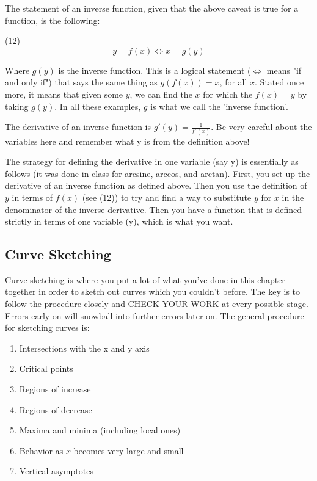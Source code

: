 \documentclass[12pt]{amsart}
\begin{document}
The statement of an inverse function, given that the above caveat is true for a function, is the following:

(12) $$ y = f(x) \iff x = g(y) $$

Where $g(y)$ is the inverse function. This is a logical statement ($\iff$ means "if and only if") that says the same thing as $g(f(x)) = x$, for all $x$. Stated once more, it means that given some $y$, we can find the $x$ for which the $f(x) = y$ by taking $g(y)$. In all these examples, $g$ is what we call the 'inverse function'.

The derivative of an inverse function is $g'(y) = \frac{1}{f'(x)}$. Be very careful about the variables here and remember what y is from the definition above!

The strategy for defining the derivative in one variable (say y) is essentially as follows (it was done in class for arcsine, arccos, and arctan). First, you set up the derivative of an inverse function as defined above. Then you use the definition of $y$ in terms of $f(x)$ (see (12)) to try and find a way to substitute $y$ for $x$ in the denominator of the inverse derivative. Then you have a function that is defined strictly in terms of one variable (y), which is what you want.

\subsection{Curve Sketching}

Curve sketching is where you put a lot of what you've done in this chapter together in order to sketch out curves which you couldn't before. The key is to follow the procedure closely and CHECK YOUR WORK at every possible stage. Errors early on will snowball into further errors later on. The general procedure for sketching curves is:

\begin{enumerate}
\item Intersections with the x and y axis
\item Critical points
\item Regions of increase
\item Regions of decrease
\item Maxima and minima (including local ones)
\item Behavior as $x$ becomes very large and small
\item Vertical asymptotes
\end{enumerate}
\end{document}
